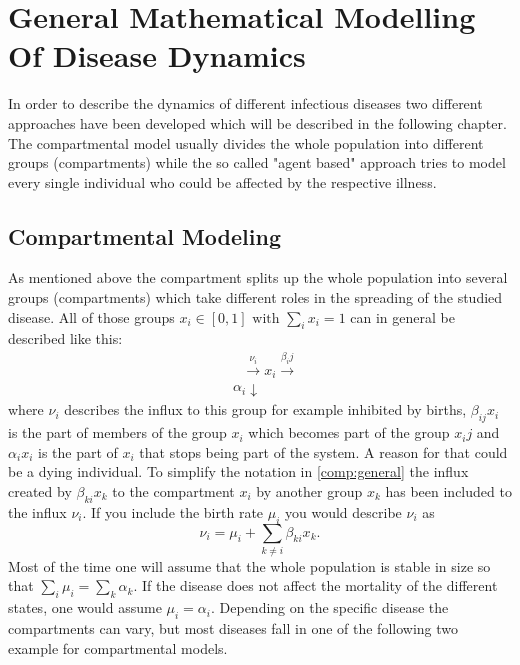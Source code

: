 \section{General Mathematical Modelling Of Disease Dynamics}
\label{chap:generalModeling}
In order to describe the dynamics of different infectious diseases two different approaches have been developed which will be described in the following chapter.
The compartmental model usually divides the whole population into different groups (compartments) while the so called "agent based" approach tries to model every single individual who could be affected by the respective illness. 
\subsection{Compartmental Modeling}
As mentioned above the compartment splits up the whole population into several groups (compartments) which take different roles in the spreading of the studied disease.
All of those groups $x_i \in [0,1] \text{ with } \sum_i x_i =1 $ can in general be described like this:
\begin{eqnarray}
&\text{     }\xrightarrow{\nu_i}  x_i \xrightarrow{\beta_ij}   \label{comp:general} \\
&{\alpha_i} \downarrow  \nonumber
\end{eqnarray}
where $\nu_i$ describes the influx to this group for example inhibited by births, $\beta_{ij} x_i$ is the part of members of the group $x_i$ which becomes part of the group $x_ij$ and $\alpha_i x_i$ is the part of $x_i$ that stops being part of the system. A reason for that could be a dying individual. To simplify the notation in \ref{comp:general} the influx created by $\beta_{ki} x_k$ to the compartment $x_i$ by another group $x_k$ has been included to the influx $\nu_i$. If you include the birth rate $\mu_i$ you would describe $\nu_i$ as 
\begin{equation}
\nu_i = \mu_i + \sum_{k\neq i}{}\beta_{ki} x_k.
\end{equation}
Most of the time one will assume that the whole population is stable in size so that $\sum_i \mu_i = \sum_{k} \alpha_k$. If the disease does not affect the mortality of the different states, one would assume $\mu_i = \alpha_i$.
Depending on the specific disease the compartments can vary, but most diseases fall in one of the following two example for compartmental models.

